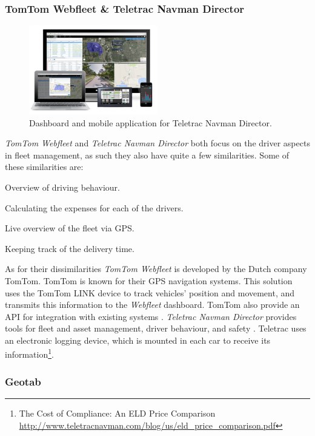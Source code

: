 \subsubsection{TomTom Webfleet \& Teletrac Navman Director}
\begin{figure}[h!]
    \centering
    \includegraphics[width=0.5\textwidth]{img/TELETRAC.jpg}
    \caption{Dashboard and mobile application for Teletrac Navman Director.}
    \label{fig:TELETRAC_NAVMAN_DIRECTOR}
\end{figure}
\textit{TomTom Webfleet} and \textit{Teletrac Navman Director} both focus on the driver aspects in fleet management, as such they also have quite a few similarities.
Some of these similarities are:
\begin{description}
    \item Overview of driving behaviour.
    \item Calculating the expenses for each of the drivers.
    \item Live overview of the fleet via GPS.
    \item Keeping track of the delivery time.
\end{description}
As for their dissimilarities \textit{TomTom Webfleet} is developed by the Dutch company TomTom. TomTom is known for their GPS navigation systems. This solution uses the TomTom LINK device to track vehicles' position and movement, and transmits this information to the \textit{Webfleet} dashboard. TomTom also provide an API for integration with existing systems \cite{tomtom}.
\textit{Teletrac Navman Director} provides tools for fleet and asset management, driver behaviour, and safety \cite{teletracnavman}.
Teletrac uses an electronic logging device, which is mounted in each car to receive its information\footnote{The Cost of Compliance: An ELD Price Comparison \url{http://www.teletracnavman.com/blog/us/eld_price_comparison.pdf}}.
\subsubsection{Geotab}

